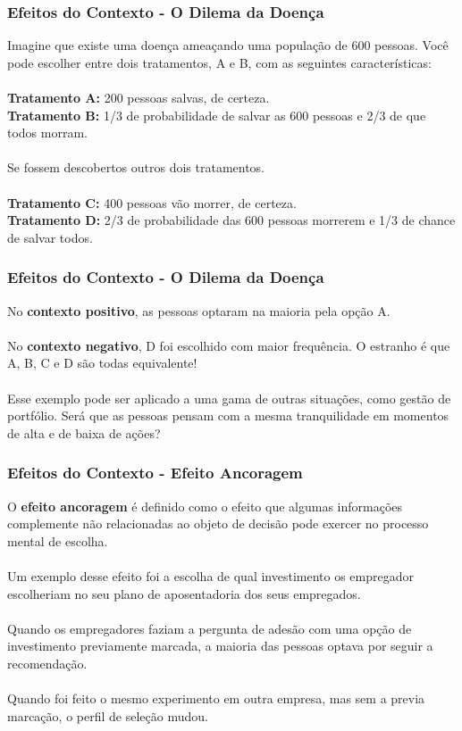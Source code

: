 \documentclass{beamer}[10]
\begin{document}
\begin{frame}
	\frametitle{Efeitos do Contexto - O Dilema da Doença}

	Imagine que existe uma doença ameaçando uma população de 600 pessoas. Você pode escolher entre dois tratamentos, A e B, com as seguintes características:
	\\~\\
	\textbf{Tratamento A:} 200 pessoas salvas, de certeza.\\
	\textbf{Tratamento B:} 1/3 de probabilidade de salvar as 600 pessoas e 2/3 de que todos morram.
	\\~\\
	Se fossem descobertos outros dois tratamentos.
	\\~\\
	\textbf{Tratamento C:} 400 pessoas vão morrer, de certeza.\\
	\textbf{Tratamento D:} 2/3 de probabilidade das 600 pessoas morrerem e 1/3 de chance de salvar todos.

\end{frame}

\begin{frame}
	\frametitle{Efeitos do Contexto - O Dilema da Doença}

	No \textbf{contexto positivo}, as pessoas optaram na maioria pela opção A.
	\\~\\
	No \textbf{contexto negativo}, D foi escolhido com maior frequência. O estranho é que A, B, C e D são todas equivalente!
	\\~\\
	Esse exemplo pode ser aplicado a uma gama de outras situações, como gestão de portfólio. Será que as pessoas pensam com a mesma tranquilidade em momentos de alta e de baixa de ações?

\end{frame}

\begin{frame}
	\frametitle{Efeitos do Contexto - Efeito Ancoragem}

	O \textbf{efeito ancoragem} é definido como o efeito que algumas informações complemente não relacionadas ao objeto de decisão pode exercer no processo mental de escolha.
	\\~\\
	Um exemplo desse efeito foi a escolha de qual investimento os empregador escolheriam no seu plano de aposentadoria dos seus empregados.
	\\~\\
	Quando os empregadores faziam a pergunta de adesão com uma opção de investimento previamente marcada, a maioria das pessoas optava por seguir a recomendação. 
	\\~\\
	Quando foi feito o mesmo experimento em outra empresa, mas sem a previa marcação, o perfil de seleção mudou.

\end{frame}
\end{document}
